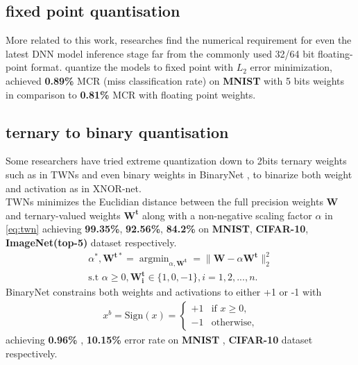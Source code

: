 \subsection{fixed point quantisation}
More related to this work, researches find the numerical requirement for even the latest DNN model inference stage far from the commonly used 32/64 bit floating-point format. \cite{FixedPoint} quantize the models to fixed point with ${L_2}$ error minimization, achieved \textbf{0.89\%} MCR (miss classification rate) on \textbf{MNIST} with 5 bits weights in comparison to \textbf{0.81\%} MCR with floating point weights.
\subsection{ternary to binary quantisation}
Some researchers have tried extreme quantization down to 2bits ternary weights such as in TWNs\cite{Ternary} and even binary weights in BinaryNet \cite{BinaryNet}, to binarize both weight and activation as in XNOR-net\cite{XnorNet}. \\
TWNs minimizes the Euclidian distance between the full precision weights $\boldsymbol{W}$ and ternary-valued weights $\boldsymbol{W^t}$ along with a non-negative scaling factor $\alpha$ in \eqref{eq:twn} achieving \textbf{99.35\%}, \textbf{92.56\%}, \textbf{84.2\%} on \textbf{MNIST}, \textbf{CIFAR-10}, \textbf{ImageNet(top-5)} dataset respectively.  
\begin{equation}
\begin{aligned}\label{eq:twn}
    \alpha^*, \boldsymbol{W^{t*}} = \mathop{\arg\min}_{\alpha,\boldsymbol{W^t}} = \|\boldsymbol{W}-\alpha\boldsymbol{W^t}\|^2_2 \\  
\text{s.t }\alpha\geq0,\boldsymbol{W^t_i}\in\{1,0,-1\}, i=1,2,...,n.
\end{aligned}
\end{equation}
BinaryNet constrains both weights and activations to either +1 or -1 with 
\begin{equation}
    \begin{aligned}\label{eq:bn}
        x^b=\text{Sign}(x)=\begin{cases}
                        +1 &\text{if \(x\geq0\)}, \\
                        -1 &\text{otherwise},
                    \end{cases}
    \end{aligned}
\end{equation}
achieving \textbf{0.96\%} , \textbf{10.15\%} error rate on \textbf{MNIST} , \textbf{CIFAR-10} dataset respectively.
